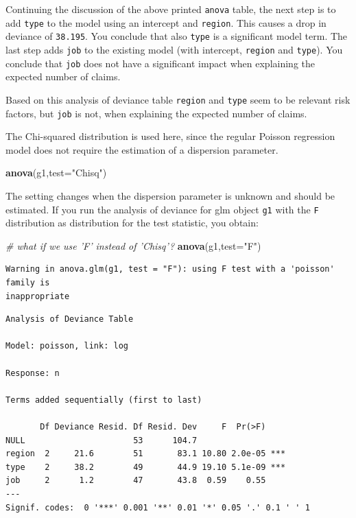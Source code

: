 \documentclass[
]{book}
\newenvironment{Shaded}{\begin{snugshade}}{\end{snugshade}}
\newcommand{\CommentTok}[1]{\textcolor[rgb]{0.56,0.35,0.01}{\textit{#1}}}
\newcommand{\DataTypeTok}[1]{\textcolor[rgb]{0.13,0.29,0.53}{#1}}
\newcommand{\KeywordTok}[1]{\textcolor[rgb]{0.13,0.29,0.53}{\textbf{#1}}}
\newcommand{\NormalTok}[1]{#1}
\newcommand{\StringTok}[1]{\textcolor[rgb]{0.31,0.60,0.02}{#1}}
\begin{document}
Continuing the discussion of the above printed \texttt{anova} table, the next step is to add \texttt{type} to the model using an intercept and \texttt{region}. This causes a drop in deviance of \texttt{38.195}. You conclude that also \texttt{type} is a significant model term. The last step adds \texttt{job} to the existing model (with intercept, \texttt{region} and \texttt{type}). You conclude that \texttt{job} does not have a significant impact when explaining the expected number of claims.

Based on this analysis of deviance table \texttt{region} and \texttt{type} seem to be relevant risk factors, but \texttt{job} is not, when explaining the expected number of claims.

The Chi-squared distribution is used here, since the regular Poisson regression model does not require the estimation of a dispersion parameter.

\begin{Shaded}
\begin{Highlighting}[]
\KeywordTok{anova}\NormalTok{(g1,}\DataTypeTok{test=}\StringTok{"Chisq"}\NormalTok{)}
\end{Highlighting}
\end{Shaded}

The setting changes when the dispersion parameter is unknown and should be estimated. If you run the analysis of deviance for glm object \texttt{g1} with the \texttt{F} distribution as distribution for the test statistic, you obtain:

\begin{Shaded}
\begin{Highlighting}[]
\CommentTok{# what if we use 'F' instead of 'Chisq'?}
\KeywordTok{anova}\NormalTok{(g1,}\DataTypeTok{test=}\StringTok{"F"}\NormalTok{) }
\end{Highlighting}
\end{Shaded}

\begin{verbatim}
Warning in anova.glm(g1, test = "F"): using F test with a 'poisson' family is
inappropriate
\end{verbatim}

\begin{verbatim}
Analysis of Deviance Table

Model: poisson, link: log

Response: n

Terms added sequentially (first to last)

       Df Deviance Resid. Df Resid. Dev     F  Pr(>F)    
NULL                      53      104.7                  
region  2     21.6        51       83.1 10.80 2.0e-05 ***
type    2     38.2        49       44.9 19.10 5.1e-09 ***
job     2      1.2        47       43.8  0.59    0.55    
---
Signif. codes:  0 '***' 0.001 '**' 0.01 '*' 0.05 '.' 0.1 ' ' 1
\end{verbatim}
\end{document}
